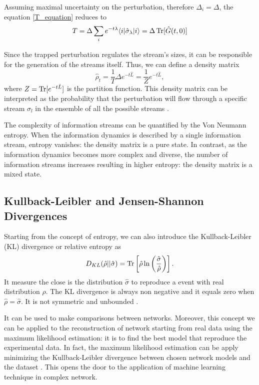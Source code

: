 Assuming maximal uncertainty on the perturbation, therefore $\Delta_i = \Delta$, the equation \eqref{T_equation} reduces to
\begin{equation}
    T = \Delta \sum_i e^{-t\lambda} \langle i\rvert  \hat \sigma_\lambda \lvert i\rangle = \Delta \operatorname{Tr} [\hat G(t,0)]
\end{equation}

Since the trapped perturbation regulates the stream's sizes, it can be responsible for the generation of the streams itself. 
Thus, we can define a density matrix 
\begin{equation}
    \hat \rho_t = \frac{1}{T} \Delta e^{-t\hat L} =  \frac{1}{Z} e^{-t\hat L},
\end{equation}
where $Z = \operatorname{Tr}[e^{-t\hat L}] $ is the partition function.
This density matrix can be interpreted as the probability that the perturbation will flow through a specific stream $\hat \sigma_l$ in the ensemble of all the possible streams \cite{De_Domenico_2020}.

The complexity of information streams can be quantified by the Von Neumann entropy.
When the information dynamics is described by a single information stream, entropy vanishes: the density matrix is a pure state.
In contrast, as the information dynamics becomes more complex and diverse, the number of information streams increases resulting in higher entropy: the density matrix is a mixed state.

\subsection{Kullback-Leibler and Jensen-Shannon Divergences}
Starting from the concept of entropy, we can also introduce the Kullback-Leibler (KL) divergence or relative entropy \cite{K-L_divergence} as
\begin{equation}\label{KL_divergence}
    D_{KL}(\hat \rho || \hat \sigma) = \operatorname{Tr} \left[\hat \rho \ln\left(\frac{\hat\sigma}{\hat\rho}\right)\right].
\end{equation}
It measure the close is the distribution $\hat \sigma$ to reproduce a event with real distribution $\hat \rho$. 
The KL divergence is always non negative and it equals zero when $\hat \rho = \hat \sigma$. It is not symmetric and unbounded \cite{J-S_divergence}.

It can be used to make comparisons between networks. Moreover, this concept we can be applied to the reconstruction of network starting from real data using the maximum likelihood estimation: it is to find the best model that reproduce the experimental data. In fact, the maximum likelihood estimation can be apply minimizing the Kullback-Leibler divergence between chosen network models and the dataset \cite{De_Domenico_2016}. This opens the door to the application of machine learning technique in complex network.


